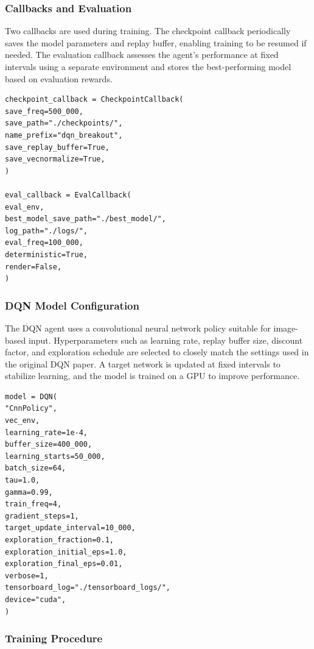 \newpage
\subsubsection{Callbacks and Evaluation}

Two callbacks are used during training. The checkpoint callback periodically saves the model parameters and replay buffer, enabling training to be resumed if needed. The evaluation callback assesses the agent’s performance at fixed intervals using a separate environment and stores the best-performing model based on evaluation rewards.

\begin{verbatim}
checkpoint_callback = CheckpointCallback(
save_freq=500_000,
save_path="./checkpoints/",
name_prefix="dqn_breakout",
save_replay_buffer=True,
save_vecnormalize=True,
)

eval_callback = EvalCallback(
eval_env,
best_model_save_path="./best_model/",
log_path="./logs/",
eval_freq=100_000,
deterministic=True,
render=False,
)
\end{verbatim}

\newpage
\subsubsection{DQN Model Configuration}

The DQN agent uses a convolutional neural network policy suitable for image-based input. Hyperparameters such as learning rate, replay buffer size, discount factor, and exploration schedule are selected to closely match the settings used in the original DQN paper. A target network is updated at fixed intervals to stabilize learning, and the model is trained on a GPU to improve performance.

\begin{verbatim}
model = DQN(
"CnnPolicy",
vec_env,
learning_rate=1e-4,
buffer_size=400_000,
learning_starts=50_000,
batch_size=64,
tau=1.0,
gamma=0.99,
train_freq=4,
gradient_steps=1,
target_update_interval=10_000,
exploration_fraction=0.1,
exploration_initial_eps=1.0,
exploration_final_eps=0.01,
verbose=1,
tensorboard_log="./tensorboard_logs/",
device="cuda",
)
\end{verbatim}

\newpage
\subsubsection{Training Procedure}

